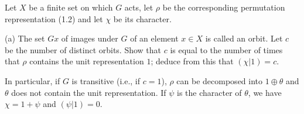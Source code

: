 Let $X$ be a finite set on which $G$ acts, let $\rho$ be the corresponding permutation representation (1.2) and let $\chi$ be its character.

(a) The set $Gx$ of images under $G$ of an element $x \in X$ is called an orbit. Let $c$ be the number of distinct orbits. Show that $c$ is equal to the number of times that $\rho$ contains the unit representation $1$; deduce from this that $(\chi|1) = c$.

In particular, if $G$ is transitive (i.e., if $c = 1$), $\rho$ can be decomposed into $1 \oplus \theta$ and $\theta$ does not contain the unit representation. If $\psi$ is the character of $\theta$, we have $\chi = 1 + \psi$ and $(\psi|1) = 0$.